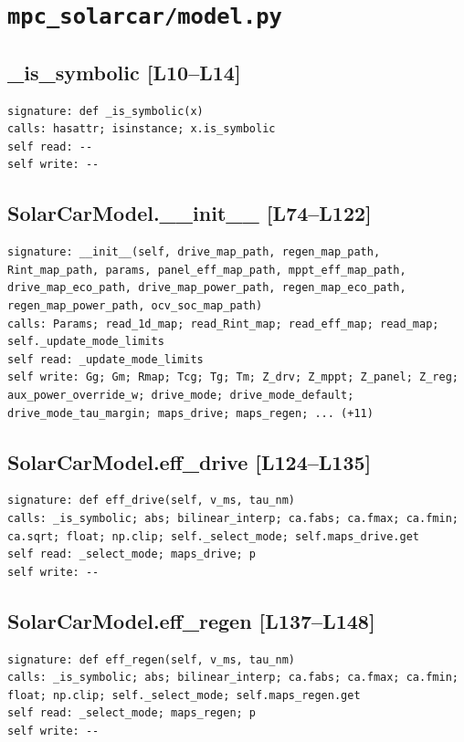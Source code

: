 \documentclass[a4paper,10pt,oneside]{book}
\begin{document}
\section{\texttt{mpc\_solarcar/model.py}}
\subsection*{\_is\_symbolic [L10--L14]}
\begin{lstlisting}[numbers=none]
signature: def _is_symbolic(x)
calls: hasattr; isinstance; x.is_symbolic
self read: --
self write: --
\end{lstlisting}
\subsection*{SolarCarModel.\_\_init\_\_ [L74--L122]}
\begin{lstlisting}[numbers=none]
signature: __init__(self, drive_map_path, regen_map_path, Rint_map_path, params, panel_eff_map_path, mppt_eff_map_path, drive_map_eco_path, drive_map_power_path, regen_map_eco_path, regen_map_power_path, ocv_soc_map_path)
calls: Params; read_1d_map; read_Rint_map; read_eff_map; read_map; self._update_mode_limits
self read: _update_mode_limits
self write: Gg; Gm; Rmap; Tcg; Tg; Tm; Z_drv; Z_mppt; Z_panel; Z_reg; aux_power_override_w; drive_mode; drive_mode_default; drive_mode_tau_margin; maps_drive; maps_regen; ... (+11)
\end{lstlisting}
\subsection*{SolarCarModel.eff\_drive [L124--L135]}
\begin{lstlisting}[numbers=none]
signature: def eff_drive(self, v_ms, tau_nm)
calls: _is_symbolic; abs; bilinear_interp; ca.fabs; ca.fmax; ca.fmin; ca.sqrt; float; np.clip; self._select_mode; self.maps_drive.get
self read: _select_mode; maps_drive; p
self write: --
\end{lstlisting}
\subsection*{SolarCarModel.eff\_regen [L137--L148]}
\begin{lstlisting}[numbers=none]
signature: def eff_regen(self, v_ms, tau_nm)
calls: _is_symbolic; abs; bilinear_interp; ca.fabs; ca.fmax; ca.fmin; float; np.clip; self._select_mode; self.maps_regen.get
self read: _select_mode; maps_regen; p
self write: --
\end{lstlisting}
\end{document}
